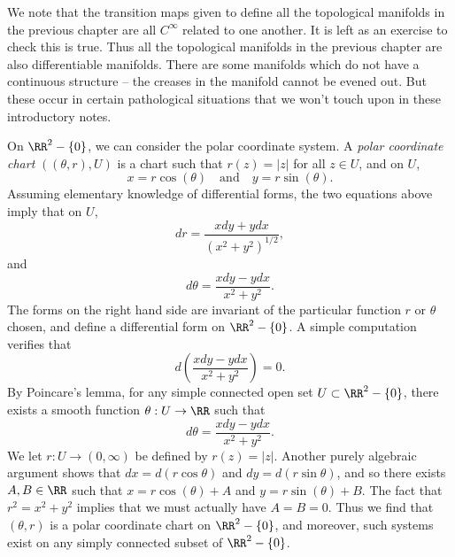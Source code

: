 We note that the transition maps given to define all the topological manifolds in the previous chapter are all $C^\infty$ related to one another. It is left as an exercise to check this is true. Thus all the topological manifolds in the previous chapter are also differentiable manifolds. There are some manifolds which do not have a continuous structure -- the creases in the manifold cannot be evened out. But these occur in certain pathological situations that we won't touch upon in these introductory notes.

\begin{example}
    On $\RR^2 - \{ 0 \}$, we can consider the polar coordinate system. A \emph{polar coordinate chart} $((\theta, r),U)$ is a chart such that $r(z) = |z|$ for all $z \in U$, and on $U$,
    \[ x = r \cos(\theta) \quad\text{and}\quad y = r \sin(\theta). \]
    Assuming elementary knowledge of differential forms, the two equations above imply that on $U$,
    \[ dr = \frac{xdy + ydx}{(x^2 + y^2)^{1/2}}, \]
    and
    \[ d\theta = \frac{x dy - y dx}{x^2 + y^2}. \]
    The forms on the right hand side are invariant of the particular function $r$ or $\theta$ chosen, and define a differential form on $\RR^2 - \{ 0 \}$. A simple computation verifies that
    \[ d \left( \frac{x dy - y dx}{x^2 + y^2} \right) = 0. \]
    By Poincare's lemma, for any simple connected open set $U \subset \RR^2 - \{ 0 \}$, there exists a smooth function $\theta: U \to \RR$ such that
    \[ d \theta = \frac{x dy - y dx}{x^2 + y^2}. \]
    We let $r: U \to (0,\infty)$ be defined by $r(z) = |z|$. Another purely algebraic argument shows that $dx = d(r \cos \theta)$ and $dy = d(r \sin \theta)$, and so there exists $A,B \in \RR$ such that $x = r \cos(\theta) + A$ and $y = r \sin(\theta) + B$. The fact that $r^2 = x^2 + y^2$ implies that we must actually have $A = B = 0$. Thus we find that $(\theta,r)$ is a polar coordinate chart on $\RR^2 - \{ 0 \}$, and moreover, such systems exist on any simply connected subset of $\RR^2 - \{ 0 \}$.
\end{example}

